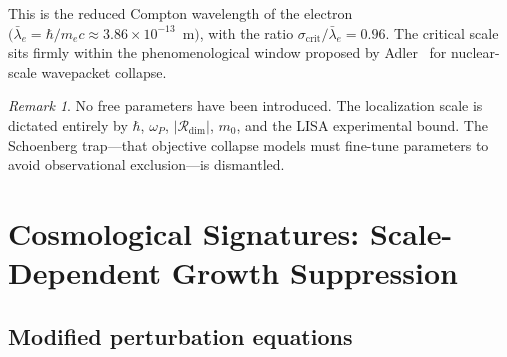 \documentclass[aps,prd,twocolumn,superscriptaddress,nofootinbib]{revtex4-2}
\theoremstyle{definition}
\theoremstyle{remark}
\newtheorem*{remark}{Remark}
\newcommand{\Rdim}{\mathcal{R}_{\mathrm{dim}}}
\newcommand{\sigcrit}{\sigma_{\mathrm{crit}}}
\newcommand{\omegaP}{\omega_P}
\begin{document}
This is the reduced Compton wavelength of the electron
$(\bar{\lambda}_e = \hbar / m_e c \approx 3.86 \times 10^{-13}$~m$)$,
with the ratio $\sigcrit / \bar{\lambda}_e = 0.96$. The critical scale
sits firmly within the phenomenological window proposed by
Adler~\cite{Adler2007} for nuclear-scale wavepacket collapse.

\begin{remark}
No free parameters have been introduced. The localization scale is
dictated entirely by $\hbar$, $\omegaP$, $|\Rdim|$, $m_0$, and the LISA
experimental bound. The Schoenberg trap---that objective collapse models
must fine-tune parameters to avoid observational exclusion---is
dismantled.
\end{remark}


\section{Cosmological Signatures: Scale-Dependent Growth Suppression}
\label{sec:cosmological_signatures}

\subsection{Modified perturbation equations}
\end{document}
